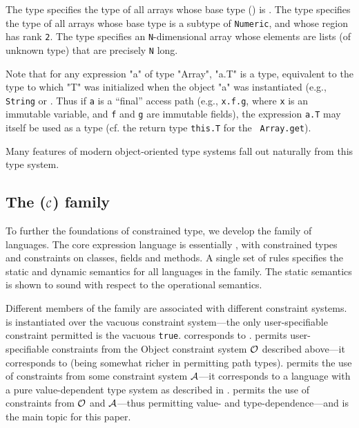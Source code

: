 The type  specifies the type of all arrays
whose base type () is . The type
 \Xcd{<:}   specifies the type of all arrays whose base
type is a subtype of {\tt Numeric}, and whose region has rank {\tt 2}.
The type 
specifies an {\tt N}-dimensional array whose elements are lists (of
unknown type) that are precisely {\tt N} long.

Note that for any expression \xcd"a" of type \xcd"Array", \xcd"a.T" is
a type, equivalent to the type to which \xcd"T" was initialized when
the object \xcd"a" was instantiated (e.g., {\tt String} or
.  Thus if {\tt a} is a ``final'' access path
(e.g., {\tt x.f.g}, where {\tt x} is an immutable variable, and {\tt f}
and {\tt g} are immutable fields), the expression {\tt a.T} may itself
be used as a type (cf. the return type {\tt this.T} for the {\tt
Array.get}).

Many features of modern object-oriented type systems fall out
naturally from this type system.

\subsection{The \FX($\cal C$) family}
To further the foundations of constrained type, we develop the \FX{}
family of languages. The core expression language is essentially
\FJ \cite{FJ}, with constrained types and constraints on classes, fields
and methods. A single set of rules specifies the static and dynamic
semantics for all languages in the family.  The static semantics is
shown to sound with respect to the operational semantics.

Different members of the family are associated with different
constraint systems. \FXZ{} is
\FX{} instantiated over the vacuous constraint system---the only
user-specifiable constraint permitted is the vacuous {\tt true}. \FXZ{}
corresponds to \FJ. \FXG{} permits user-specifiable constraints from the 
Object constraint system $\cal O$ described above---it corresponds to
\FGJ{} (being somewhat richer in permitting path types). \FXD{} permits
the use of constraints from some constraint system $\cal A$---it
corresponds to a language with a pure value-dependent type system as
described in \cite{constrained-types}. \FXGD{} permits the use of constraints
from $\cal O$ and $\cal A$---thus permitting value- and
type-dependence---and is the main topic for this paper.


